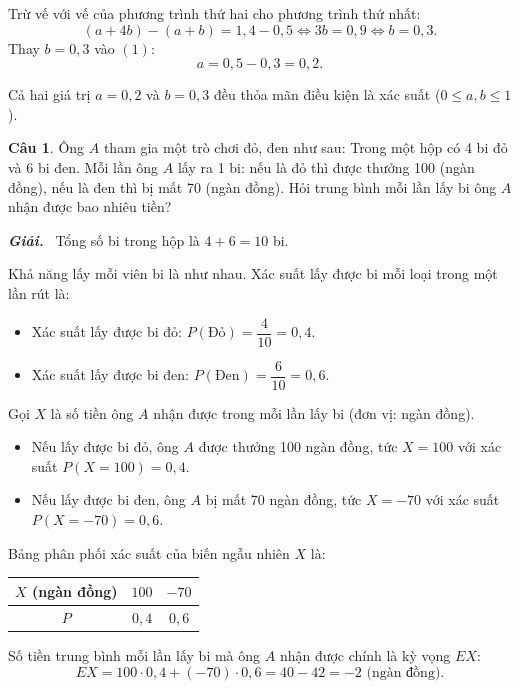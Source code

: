 \documentclass[12pt,a4paper]{article}
\theoremstyle{definition}
\newtheorem{cau}{Câu}
\newcommand{\giai}{\noindent\textbf{\textit{Giải.}}\ }
\newcommand{\dapso}[1]{\noindent\fbox{\parbox{\dimexpr\linewidth-2\fboxsep-2\fboxrule\relax}{\textbf{Đáp số:} #1}}}
\begin{document}
Trừ vế với vế của phương trình thứ hai cho phương trình thứ nhất:
\[
(a + 4b) - (a + b) = 1{,}4 - 0{,}5 \iff 3b = 0{,}9 \iff b = 0{,}3.
\]
Thay $b = 0{,}3$ vào $(1)$:
\[
a = 0{,}5 - 0{,}3 = 0{,}2.
\]

Cả hai giá trị $a = 0{,}2$ và $b = 0{,}3$ đều thỏa mãn điều kiện là xác suất ($0 \le a, b \le 1$).

\dapso{a = 0{,}2;\quad b = 0{,}3}

\vspace{1.5em}

\begin{cau}
Ông $A$ tham gia một trò chơi đỏ, đen như sau: Trong một hộp có 4 bi đỏ và 6 bi đen. Mỗi lần ông $A$ lấy ra 1 bi: nếu là đỏ thì được thưởng 100 (ngàn đồng), nếu là đen thì bị mất 70 (ngàn đồng). Hỏi trung bình mỗi lần lấy bi ông $A$ nhận được bao nhiêu tiền?
\end{cau}

\giai
Tổng số bi trong hộp là $4 + 6 = 10$ bi.

Khả năng lấy mỗi viên bi là như nhau. Xác suất lấy được bi mỗi loại trong một lần rút là:
\begin{itemize}
    \item Xác suất lấy được bi đỏ: $P(\text{Đỏ}) = \dfrac{4}{10} = 0{,}4$.
    \item Xác suất lấy được bi đen: $P(\text{Đen}) = \dfrac{6}{10} = 0{,}6$.
\end{itemize}

Gọi $X$ là số tiền ông $A$ nhận được trong mỗi lần lấy bi (đơn vị: ngàn đồng).
\begin{itemize}
    \item Nếu lấy được bi đỏ, ông $A$ được thưởng 100 ngàn đồng, tức $X = 100$ với xác suất $P(X = 100) = 0{,}4$.
    \item Nếu lấy được bi đen, ông $A$ bị mất 70 ngàn đồng, tức $X = -70$ với xác suất $P(X = -70) = 0{,}6$.
\end{itemize}

Bảng phân phối xác suất của biến ngẫu nhiên $X$ là:
\begin{center}
\begin{tabular}{|c|c|c|}
\hline
$X$ (ngàn đồng) & $100$ & $-70$ \\
\hline
$P$ & $0{,}4$ & $0{,}6$ \\
\hline
\end{tabular}
\end{center}

Số tiền trung bình mỗi lần lấy bi mà ông $A$ nhận được chính là kỳ vọng $EX$:
\[
EX = 100 \cdot 0{,}4 + (-70) \cdot 0{,}6 = 40 - 42 = -2 \text{ (ngàn đồng)}.
\]
\end{document}
